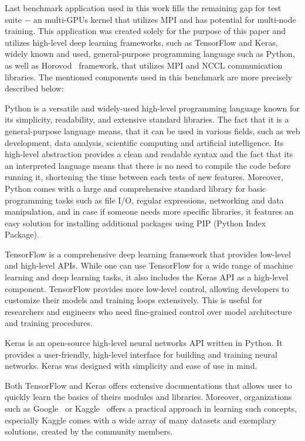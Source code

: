 Last benchmark application used in this work fills the remaining gap for test
suite $-$ an multi-GPUs kernel that utilizes MPI and has potential for
multi-node training. This application was created solely for the purpose of
this paper and utilizes high-level deep learning frameworks, such as
TensorFlow and Keras, widely known and used, general-purpose programming
language such as Python, as well as Horovod~\cite{Horovod_IDRIS} framework,
that utilizes MPI and NCCL communication libraries. The mentioned components
used in this benchmark are more precisely described below:

Python is a versatile and widely-used high-level programming language known
for its simplicity, readability, and extensive standard libraries. The fact
that it is a general-purpose language means, that it can be used in various
fields, such as web development, data analysis, scientific computing and
artificial intelligence. Its high-level abstraction provides a clean and
readable syntax and the fact that its an interpreted language means that
there is no need to compile the code before running it, shortening the
time between each tests of new features. Moreover, Python comes with a large
and comprehensive standard library for basic programming tasks such as file I/O,
regular expressions, networking and data manipulation, and in case if someone
needs more specific libraries, it features an easy solution for installing
additional packages using PIP (Python Index Package).

TensorFlow is a comprehensive deep learning framework that provides low-level
and high-level APIs. While one can use TensorFlow for a wide range of machine
learning and deep learning tasks, it also includes the Keras API as a high-level
component. TensorFlow provides more low-level control, allowing developers to
customize their models and training loops extensively. This is useful for
researchers and engineers who need fine-grained control over model architecture
and training procedures.

Keras is an open-source high-level neural networks API written in Python.
It provides a user-friendly, high-level interface for building and training
neural networks. Keras was designed with simplicity and ease of use in mind.

Both TensorFlow and Keras offers extensive documentations that allows user
to quickly learn the basics of theirs modules and libraries. Moreover,
organizations such as Google~\cite{Google_Machine_Learning_Crash_Course}
or Kaggle~\cite{Kaggle} offers a practical approach in learning such concepts,
especially Kaggle comes with a wide array of many datasets and exemplary
solutions, created by the community members.

